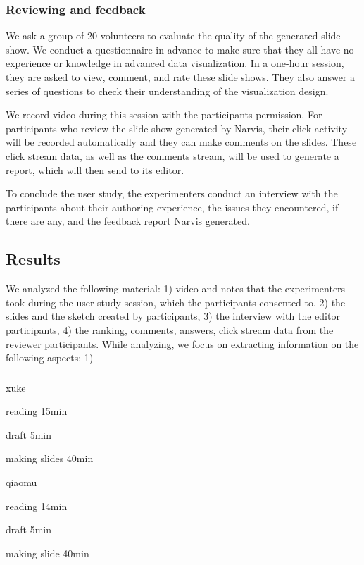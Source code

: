 \documentclass[review,journal]{vgtc}         %
\begin{document}
\subsubsection{Reviewing and feedback}
We ask a group of 20 volunteers to evaluate the quality of the generated slide show. We conduct a questionnaire in advance to make sure that they all have no experience or knowledge in advanced data visualization. In a one-hour session, they are asked to view, comment, and rate these slide shows. They also answer a series of questions to check their understanding of the visualization design. \par 
We record video during this session with the participants permission. For participants who review the slide show generated by Narvis, their click activity will be recorded automatically and they can make comments on the slides. These click stream data, as well as the comments stream, will be used to generate a report, which will then send to its editor. \par
To conclude the user study, the experimenters conduct an interview with the participants about their authoring experience, the issues they encountered, if there are any, and the feedback report Narvis generated. \par
\subsection{Results}
We analyzed the following material: 1) video and notes that the experimenters took during the user study session, which the participants consented to. 2) the slides and the sketch created by participants, 3) the interview with the editor participants, 4) the ranking, comments, answers, click stream data from the reviewer participants. While analyzing, we focus on extracting information on the following aspects: 1)
\subsubsection{}
\subsubsection{}
xuke\par
reading 15min\par
draft 5min \par
making slides 40min \par
qiaomu\par
reading 14min\par
draft 5min\par
making slide 40min\par
\end{document}
